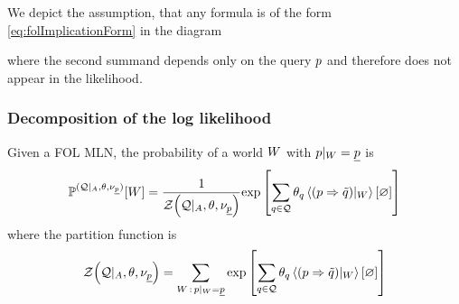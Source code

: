 We depict the assumption, that any formula is of the form \eqref{eq:folImplicationForm} in the diagram
\begin{center}
	
\end{center}
where the second summand depends only on the query $p$ and therefore does not appear in the likelihood.







	
\subsubsection{Decomposition of the log likelihood}







Given a FOL MLN, the probability of a world $W$ with ${p}|_{W}=\underline{p}$ is %
\begin{align*}
	\mathbb{P}^{(\mathcal{Q} |_{A},\theta , \nu_{\underline{p}})} [W]
	= \frac{1}{\mathcal{Z}{\left(\mathcal{Q} |_{A},\theta , \nu_{\underline{p}}\right)}} 
		\mathrm{exp}\left[\sum_{q\in\mathcal{Q}}\theta_{q}\left\langle {(p\Rightarrow\tilde{q})}|_{W}\right\rangle \left[ \varnothing \right]\right] 
\end{align*}
where the partition function is 
\begin{align*}
	\mathcal{Z}{\left(\mathcal{Q} |_{A},\theta , \nu_{\underline{p}}\right)} = 
	\sum_{W \, : \, {p}|_{W} = \underline{p}}
			\mathrm{exp}\left[\sum_{q\in\mathcal{Q}}\theta_{q}\left\langle {(p\Rightarrow\tilde{q})}|_{W}\right\rangle \left[ \varnothing \right]\right] 
\end{align*}


